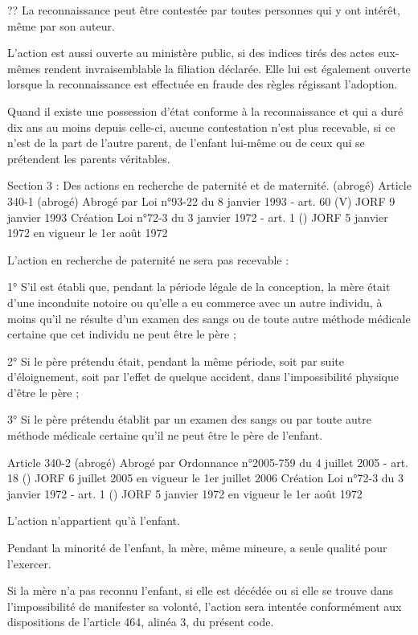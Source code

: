 \documentclass[
  12pt,
]{book}
\begin{document}
\begin{encadre}{??}
La reconnaissance peut être contestée par toutes personnes qui y ont intérêt, même par son auteur.

L'action est aussi ouverte au ministère public, si des indices tirés des actes eux-mêmes rendent invraisemblable la filiation déclarée. Elle lui est également ouverte lorsque la reconnaissance est effectuée en fraude des règles régissant l'adoption.

Quand il existe une possession d'état conforme à la reconnaissance et qui a duré dix ans au moins depuis celle-ci, aucune contestation n'est plus recevable, si ce n'est de la part de l'autre parent, de l'enfant lui-même ou de ceux qui se prétendent les parents véritables.

Section 3 : Des actions en recherche de paternité et de maternité. (abrogé)
Article 340-1 (abrogé)
Abrogé par Loi n°93-22 du 8 janvier 1993 - art. 60 (V) JORF 9 janvier 1993
Création Loi n°72-3 du 3 janvier 1972 - art. 1 () JORF 5 janvier 1972 en vigueur le 1er août 1972

L'action en recherche de paternité ne sera pas recevable :

1° S'il est établi que, pendant la période légale de la conception, la mère était d'une inconduite notoire ou qu'elle a eu commerce avec un autre individu, à moins qu'il ne résulte d'un examen des sangs ou de toute autre méthode médicale certaine que cet individu ne peut être le père ;

2° Si le père prétendu était, pendant la même période, soit par suite d'éloignement, soit par l'effet de quelque accident, dans l'impossibilité physique d'être le père ;

3° Si le père prétendu établit par un examen des sangs ou par toute autre méthode médicale certaine qu'il ne peut être le père de l'enfant.

Article 340-2 (abrogé)
Abrogé par Ordonnance n°2005-759 du 4 juillet 2005 - art. 18 () JORF 6 juillet 2005 en vigueur le 1er juillet 2006
Création Loi n°72-3 du 3 janvier 1972 - art. 1 () JORF 5 janvier 1972 en vigueur le 1er août 1972

L'action n'appartient qu'à l'enfant.

Pendant la minorité de l'enfant, la mère, même mineure, a seule qualité pour l'exercer.

Si la mère n'a pas reconnu l'enfant, si elle est décédée ou si elle se trouve dans l'impossibilité de manifester sa volonté, l'action sera intentée conformément aux dispositions de l'article 464, alinéa 3, du présent code.


\end{encadre}
\end{document}
